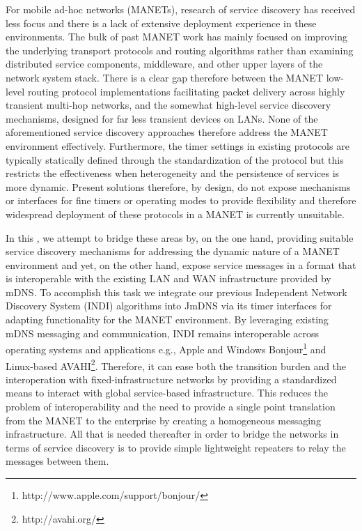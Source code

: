 For mobile ad-hoc networks (MANETs), research of service discovery has received less focus and there is a lack of extensive deployment experience in these environments. The bulk of past MANET work has mainly focused on improving the underlying transport protocols and routing algorithms rather than examining distributed service components, middleware, and other upper layers of the network system stack. There is a clear gap therefore between the MANET low-level routing protocol implementations facilitating packet delivery across highly transient multi-hop networks, and the somewhat high-level service discovery mechanisms, designed for far less transient devices on LANs.  None of the aforementioned service discovery approaches therefore address the MANET environment effectively.   Furthermore, the timer settings in existing protocols are typically statically defined through the standardization of the protocol but this restricts the effectiveness when heterogeneity and the persistence of services is more dynamic.  Present solutions therefore, by design, do not expose mechanisms or interfaces for fine timers or operating modes to provide flexibility and therefore widespread deployment of these protocols in a MANET is currently unsuitable. 

In this \doctype, we attempt to bridge these areas by, on the one hand, providing suitable service discovery mechanisms for addressing the dynamic nature of a MANET environment and yet, on the other hand, expose service messages in a format that is interoperable with the existing LAN and WAN infrastructure provided by mDNS.   To accomplish this task we integrate our previous Independent Network Discovery System (INDI) algorithms \cite{Macker2010} into JmDNS via its timer interfaces for adapting functionality for the MANET environment. By leveraging existing mDNS messaging and communication, INDI remains interoperable across operating systems and applications e.g., Apple and Windows Bonjour\footnote{http://www.apple.com/support/bonjour/} and Linux-based AVAHI\footnote{http://avahi.org/}. Therefore, it can ease both the transition burden and the interoperation with fixed-infrastructure networks by providing a standardized means to interact with global service-based infrastructure.    This reduces the problem of interoperability and the need to provide a single point translation from the MANET to the enterprise by creating a homogeneous messaging infrastructure. All that is needed thereafter in order to bridge the networks in terms of service discovery is to provide simple lightweight repeaters to relay the messages between them.  

